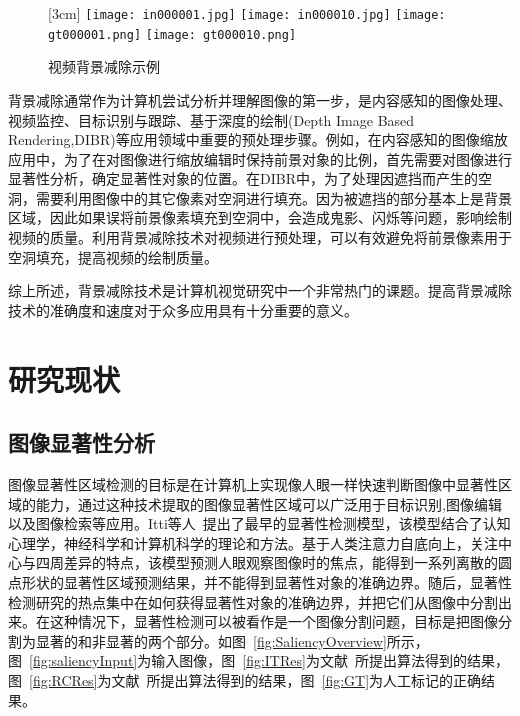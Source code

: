 \begin{figure}[h]
  \centering%
  [3cm] %
    {\texttt{[image: in000001.jpg]}}%
  \hspace{1em}%
      {\texttt{[image: in000010.jpg]}}
  \hspace{1em}%
      {\texttt{[image: gt000001.png]}}
   \hspace{1em}%
    {\texttt{[image: gt000010.png]}}

  \caption{视频背景减除示例}
  \label{fig:videoBS}
\end{figure}
\par

背景减除通常作为计算机尝试分析并理解图像的第一步，是内容感知的图像处理、视频监控、目标识别与跟踪、基于深度的绘制(Depth Image Based Rendering,DIBR)等应用领域中重要的预处理步骤。例如，在内容感知的图像缩放应用中，为了在对图像进行缩放编辑时保持前景对象的比例，首先需要对图像进行显著性分析，确定显著性对象的位置。在DIBR中，为了处理因遮挡而产生的空洞，需要利用图像中的其它像素对空洞进行填充。因为被遮挡的部分基本上是背景区域，因此如果误将前景像素填充到空洞中，会造成鬼影、闪烁等问题，影响绘制视频的质量。利用背景减除技术对视频进行预处理，可以有效避免将前景像素用于空洞填充，提高视频的绘制质量。\par

综上所述，背景减除技术是计算机视觉研究中一个非常热门的课题。提高背景减除技术的准确度和速度对于众多应用具有十分重要的意义。
\section{研究现状}
\label{sec:second}
\subsection{图像显著性分析}
\label{sec:imageSaliency}
图像显著性区域检测的目标是在计算机上实现像人眼一样快速判断图像中显著性区域的能力，通过这种技术提取的图像显著性区域可以广泛用于目标识别,图像编辑以及图像检索等应用。Itti等人~\cite{itti}提出了最早的显著性检测模型，该模型结合了认知心理学，神经科学和计算机科学的理论和方法。基于人类注意力自底向上，关注中心与四周差异的特点，该模型预测人眼观察图像时的焦点，能得到一系列离散的圆点形状的显著性区域预测结果，并不能得到显著性对象的准确边界。随后，显著性检测研究的热点集中在如何获得显著性对象的准确边界，并把它们从图像中分割出来。在这种情况下，显著性检测可以被看作是一个图像分割问题，目标是把图像分割为显著的和非显著的两个部分。如图~\ref{fig:SaliencyOverview}所示，图~\ref{fig:saliencyInput}为输入图像，图~\ref{fig:ITRes}为文献~所提出算法得到的结果，图~\ref{fig:RCRes}为文献~所提出算法得到的结果，图~\ref{fig:GT}为人工标记的正确结果。

